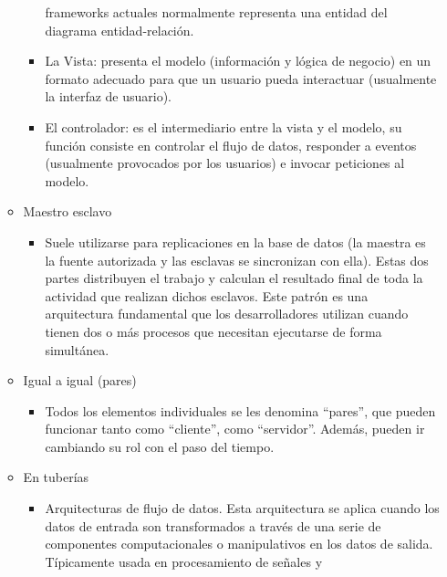 \documentclass[12pt, twoside, openright]{report} %
\begin{document}
\begin{itemize}
\begin{itemize}
\begin{itemize}
			                  frameworks actuales normalmente representa una entidad del
			                  diagrama entidad-relación.
			            \item La Vista: presenta el modelo (información y lógica de negocio)
			                  en un formato adecuado para que un usuario pueda interactuar
			                  (usualmente la interfaz de usuario).
			            \item El controlador: es el intermediario entre la vista y el modelo,
			                  su función consiste en controlar el flujo de datos, responder a
			                  eventos (usualmente provocados por los usuarios) e invocar
			                  peticiones al modelo.
		            \end{itemize}
		      \item Maestro esclavo
		            \begin{itemize}
			            \item Suele utilizarse para replicaciones en la base de datos (la
			                  maestra es la fuente autorizada y las esclavas se sincronizan
			                  con ella). Estas dos partes distribuyen el trabajo y calculan el
			                  resultado final de toda la actividad que realizan dichos
			                  esclavos. Este patrón es una arquitectura fundamental que los
			                  desarrolladores utilizan cuando tienen dos o más procesos que
			                  necesitan ejecutarse de forma simultánea.
		            \end{itemize}
		      \item Igual a igual (pares)
		            \begin{itemize}
			            \item Todos los elementos individuales se les denomina \enquote{pares}, que
			                  pueden funcionar tanto como \enquote{cliente}, como \enquote{servidor}. Además,
			                  pueden ir cambiando su rol con el paso del tiempo.
		            \end{itemize}
		      \item En tuberías
		            \begin{itemize}
			            \item Arquitecturas de flujo de datos. Esta arquitectura se aplica
			                  cuando los datos de entrada son transformados a través de una
			                  serie de componentes computacionales o manipulativos en los
			                  datos de salida. Típicamente usada en procesamiento de señales y

\end{itemize}
\end{itemize}
\end{itemize}
\end{document}
